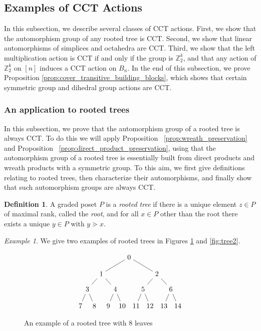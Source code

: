 \documentclass[smallextended, envcountsame, numbook]{svjour3}
\theoremstyle{plain}
\theoremstyle{definition}
\newtheorem{defn}[thm]{Definition}
\theoremstyle{remark}
\newtheorem{eg}[thm]{Example}
\numberwithin{equation}{section}
\newcommand\ssec{\subsection}
\newcommand\sssec{\subsubsection}
\begin{document}

\ssec{Examples of CCT Actions}\label{ssec:CCT_examples}

In this subsection, we describe several classes of CCT actions. First, we show that the automorphism group of any rooted tree is CCT. Second, we show that linear automorphisms of simplices and octahedra are CCT. Third, we show that the left multiplication action is CCT if and only if the group is $\mathbb Z_2^k$, and that any action of $\mathbb Z_2^k$ on $[n]$ induces a CCT action on $B_n$. In the end of this subsection, we prove Proposition \ref{prop:cover_transitive_building_blocks}, which shows that certain symmetric group and dihedral group actions are CCT.

\sssec{An application to rooted trees}
\label{ssec:rooted_trees}
In this subsection, we prove that the automorphism group of a rooted tree is always CCT. To do this we will apply Proposition ~\ref{prop:wreath_preservation} and Proposition ~\ref{prop:direct_product_preservation}, using that the automorphism group of a  rooted tree is essentially built from direct products and wreath products with a symmetric group. To this aim, we first give definitions relating to rooted trees, then characterize their automorphisms, and finally show that such automorphism groups are always CCT.

\begin{defn}
A graded poset $P$ is a {\it rooted tree} if there is a unique element $z \in P$ of maximal rank, called the {\it root}, and for all $x \in P$ other than the root there exists a unique $y \in P$ with $y \gtrdot x$.
\end{defn}

\begin{eg}
We give two examples of rooted trees in Figures \ref{fig:tree1} and \ref{fig:tree2}.
\end{eg}
\begin{figure}[h!]
\[\begin{tikzpicture}[scale=.7]
  \node (0) at (-4,0) {$7$};
  \node (1) at (-3,0) {$8$};
  \node (2) at (-2,0) {$9$};
  \node (3) at (-1,0) {$10$};
    \node (4) at (0,0) {$11$};
  \node (5) at (1,0) {$12$};
  \node (6) at (2,0) {$13$};
  \node (7) at (3,0) {$14$};
  \node (8) at (-3.5,1.2) {$3$};
  \node (9) at (-1.5,1.2) {$4$};
  \node (10) at (.5,1.2) {$5$};
  \node (11) at (2.5,1.2) {$6$};
    \node (12) at (-2.5,2.3) {$1$};
  \node (13) at (1.5,2.3) {$2$};
  \node (14) at (-.5,3.5) {$0$};
  \draw (0)--(8);
  \draw (1)--(8);
  \draw (2)--(9);
  \draw (3)--(9);
  \draw (4)--(10);
  \draw (5)--(10);
  \draw (6)--(11);
  \draw (7)--(11);
  \draw (8)--(12);
  \draw (9)--(12);
  \draw (10)--(13);
  \draw (11)--(13);
  \draw (12)--(14);
  \draw (13)--(14);
\end{tikzpicture}\]
\caption{\label{fig:tree1} An example of a rooted tree with $8$ leaves}
\end{figure}
\end{document}
